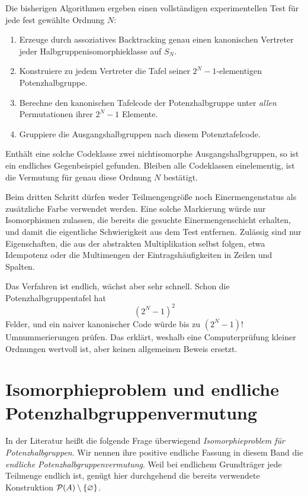 \documentclass[main.tex]{subfiles}
\begin{document}
Die bisherigen Algorithmen ergeben einen vollständigen experimentellen Test
für jede fest gewählte Ordnung \(N\):
\begin{enumerate}
  \item Erzeuge durch assoziatives Backtracking genau einen kanonischen
    Vertreter jeder Halbgruppenisomorphieklasse auf \(S_N\).
  \item Konstruiere zu jedem Vertreter die Tafel seiner
    \(2^N-1\)-elementigen Potenzhalbgruppe.
  \item Berechne den kanonischen Tafelcode der Potenzhalbgruppe unter
    \emph{allen} Permutationen ihrer \(2^N-1\) Elemente.
  \item Gruppiere die Ausgangshalbgruppen nach diesem Potenztafelcode.
\end{enumerate}
Enthält eine solche Codeklasse zwei nichtisomorphe Ausgangshalbgruppen, so ist
ein endliches Gegenbeispiel gefunden.  Bleiben alle Codeklassen einelementig,
ist die Vermutung für genau diese Ordnung \(N\) bestätigt.

\begin{remark}
Beim dritten Schritt dürfen weder Teilmengengröße noch Einermengenstatus als
zusätzliche Farbe verwendet werden.  Eine solche Markierung würde nur
Isomorphismen zulassen, die bereits die gesuchte Einermengenschicht erhalten,
und damit die eigentliche Schwierigkeit aus dem Test entfernen.  Zulässig
sind nur Eigenschaften, die aus der abstrakten Multiplikation selbst folgen,
etwa Idempotenz oder die Multimengen der Eintragshäufigkeiten in Zeilen und
Spalten.
\end{remark}

Das Verfahren ist endlich, wächst aber sehr schnell.  Schon die
Potenzhalbgruppentafel hat
\[
  (2^N-1)^2
\]
Felder, und ein naiver kanonischer Code würde bis zu
\((2^N-1)!\) Umnummerierungen prüfen.  Das erklärt, weshalb eine
Computerprüfung kleiner Ordnungen wertvoll ist, aber keinen allgemeinen
Beweis ersetzt.

\section{Isomorphieproblem und endliche Potenzhalbgruppenvermutung}

In der Literatur heißt die folgende Frage überwiegend
\emph{Isomorphieproblem für Potenzhalbgruppen}.  Wir nennen ihre positive
endliche Fassung in diesem Band die \emph{endliche
Potenzhalbgruppenvermutung}.  Weil bei endlichem Grundträger jede Teilmenge
endlich ist, genügt hier durchgehend die bereits verwendete Konstruktion
\(\mathcal{P}(A)\setminus\{\varnothing\}\).
\end{document}
